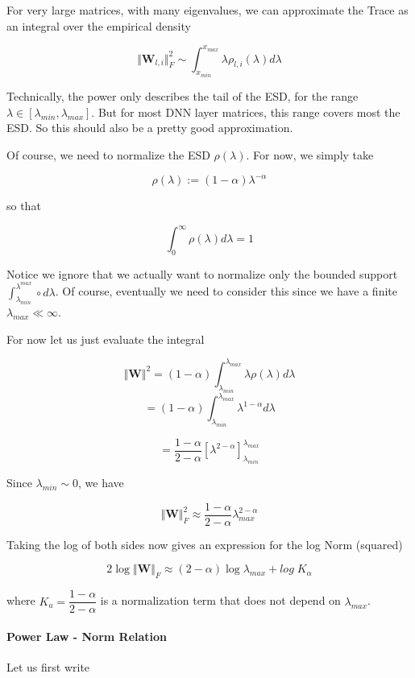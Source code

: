 For very large matrices, with many eigenvalues, we can approximate the Trace as an integral over the empirical density

$$\Vert\mathbf{W}_{l,i}\Vert_{F}^{2}\sim\int_{x_{min}}^{x_{max}}\lambda\rho_{l,i}(\lambda)d\lambda$$

Technically, the power only describes the tail of the ESD,  for the range $\lambda\in[\lambda_{min},\lambda_{max}]$.
  But for most DNN layer matrices, this range covers most the ESD.  So this should also be a pretty good approximation.
  
Of course,  we need to normalize the ESD $\rho(\lambda)$. For now, we simply take

$$\rho(\lambda):=(1-\alpha)\lambda^{-\alpha}$$

so that

$$\int_{0}^{\infty}\rho(\lambda)d\lambda=1$$

Notice we ignore that we actually want to normalize only the bounded support  $\int_{\lambda_{min}}^{\lambda^{max}}\circ d\lambda$.
Of course, eventually we need to consider this since we have a finite $\lambda_{max}\ll\infty$.  

For now let us just evaluate the integral

$$\Vert\mathbf{W}\Vert^{2}=(1-\alpha)\int_{\lambda_{min}}^{\lambda_{max}}\lambda\rho(\lambda)d\lambda$$
$$=(1-\alpha)\int_{\lambda_{min}}^{\lambda_{max}}\lambda^{1-\alpha}d\lambda$$

$$=\dfrac{1-\alpha}{2-\alpha}\left[\lambda^{2-\alpha}\right]^{\lambda_{max}}_{\lambda_{min}}$$

Since $\lambda_{min}\sim 0$, we have 

$$\Vert\mathbf{W}\Vert_{F}^{2}\approx\dfrac{1-\alpha}{2-\alpha}\lambda^{2-\alpha}_{max}$$

Taking the log of both sides now gives an expression for the log Norm (squared) 

$$2\log\Vert\mathbf{W}\Vert_{F}\approx(2-\alpha)\log\lambda_{max}+log\;K_{\alpha}$$

where $K_{a}={\dfrac{1-\alpha}{2-\alpha}}$ is a normalization term that does not  depend on $\lambda_{max}$.

\paragraph{Power Law - Norm Relation}


Let us first write

